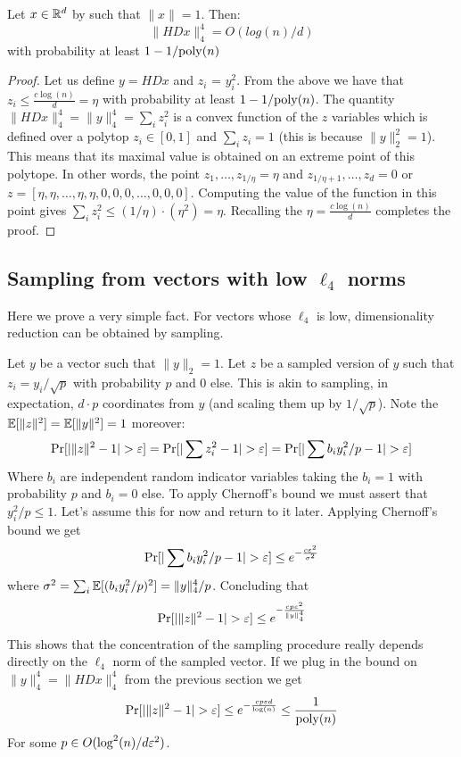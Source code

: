 \documentclass{article}
\begin{document}
\begin{lemma}
Let $x \in {\mathbb{R}}^d$ by such that $\|x\|=1$. Then:
\[
\|HDx\|^4_4 = O(log(n)/d)
\]
with probability at least $1-1/{\operatorname{poly}}(n)$
\end{lemma}
\begin{proof}
Let us define $y = HDx$ and $z_i$ = $y_i^2$. 
From the above we have that $z_i \le \frac{c \log(n)}{d} = \eta$ with probability at least $1-1/{\operatorname{poly}}(n)$.
The quantity $\|HDx\|^4_4 = \|y\|_{4}^{4} = \sum_{i}z_i^2$ is a convex function of the $z$ variables which is defined over a polytop $z_i \in [0,1]$ and $\sum_{i} z_i = 1$ (this is because $\|y\|_2^2 = 1$).
This means that its maximal value is obtained on an extreme point of this polytope. 
In other words, the point $z_1,\ldots,z_{1/\eta} = \eta$ and $z_{1/\eta+1},\ldots,z_{d} = 0$ or $z = [\eta,\eta,\ldots,\eta,\eta,0,0,0,\ldots,0,0,0]$.
Computing the value of the function in this point gives $\sum_{i}z_i^2 \le (1/\eta)\cdot (\eta^2) = \eta$. Recalling the $\eta = \frac{c \log(n)}{d}$ completes the proof.  
\end{proof}

\subsection{Sampling from vectors with low $\ell_4$ norms}
Here we prove a very simple fact. For vectors whose $\ell_4$ is low, dimensionality reduction can be obtained by sampling.


Let $y$ be a vector such that $\|y\|_2 = 1$. Let $z$ be a sampled version of $y$ such that $z_i = y_i/\sqrt{p}$ with probability $p$ and $0$ else. 
This is akin to sampling, in expectation, $d\cdot p$ coordinates from $y$ (and scaling them up by $1/\sqrt{p}$).
Note the ${\mathbb E}[\|z\|^2] = {\mathbb E}[\|y\|^2] = 1$ moreover:
\[
\Pr[|\|z\|^2 - 1| > \varepsilon] = \Pr[|\sum z_i^2 - 1| > \varepsilon] = \Pr[|\sum b_i y_i^2/p - 1| > \varepsilon]
\]
Where $b_i$ are independent random indicator variables taking the $b_i = 1$ with probability $p$ and $b_i = 0$ else.
To apply Chernoff's bound we must assert that $y_i^2/p \le 1$. Let's assume this for now and return to it later.
Applying Chernoff's bound we get
\[
\Pr[|\sum b_i y_i^2/p - 1| > \varepsilon] \le e^{-\frac{c\varepsilon^2}{\sigma^2}}
\]
where $\sigma^2 = \sum_{i} {\mathbb E}[(b_i y_i^2/p)^2] = \|y\|_{4}^{4}/p$.
Concluding that
\[
\Pr[|\|z\|^2 - 1| > \varepsilon] \le e^{-\frac{cp\varepsilon^2}{\|y\|_4^4}}
\]
This shows that the concentration of the sampling procedure really depends directly on the $\ell_4$ norm of the sampled vector.
If we plug in the bound on $\|y\|_4^4 = \|HDx\|_4^4$ from the previous section we get 
\[
\Pr[|\|z\|^2 - 1| > \varepsilon] \le e^{-\frac{cp\varepsilon d}{\log(n)}} \le \frac{1}{{\operatorname{poly}}(n)}
\]
For some $p \in O(\log^2(n)/d\varepsilon^2)$. 
\end{document}
